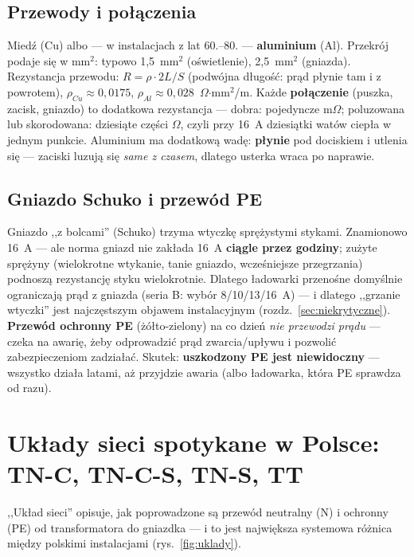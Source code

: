 \documentclass[11pt,a4paper]{article}
\newcommand{\ohm}{$\Omega$}
\begin{document}
\subsection{Przewody i połączenia}
Miedź (Cu) albo --- w instalacjach z lat 60.--80. --- \textbf{aluminium} (Al). Przekrój podaje się
w mm$^2$: typowo 1,5~mm$^2$ (oświetlenie), 2,5~mm$^2$ (gniazda). Rezystancja przewodu:
$R=\rho\cdot 2L/S$ (podwójna długość: prąd płynie tam i z powrotem), $\rho_{Cu}\approx0{,}0175$,
$\rho_{Al}\approx0{,}028$~\ohm$\cdot$mm$^2$/m. Każde \textbf{połączenie} (puszka, zacisk, gniazdo)
to dodatkowa rezystancja --- dobra: pojedyncze m\ohm; poluzowana lub skorodowana: dziesiąte części
\ohm{}, czyli przy 16~A dziesiątki watów ciepła w jednym punkcie. Aluminium ma dodatkową wadę:
\textbf{płynie} pod dociskiem i utlenia się --- zaciski luzują się \emph{same z czasem}, dlatego
usterka wraca po naprawie.

\subsection{Gniazdo Schuko i przewód PE}
Gniazdo ,,z bolcami'' (Schuko) trzyma wtyczkę sprężystymi stykami. Znamionowo 16~A --- ale norma
gniazd nie zakłada 16~A \textbf{ciągle przez godziny}; zużyte sprężyny (wielokrotne wtykanie,
tanie gniazdo, wcześniejsze przegrzania) podnoszą rezystancję styku wielokrotnie. Dlatego ładowarki
przenośne domyślnie ograniczają prąd z gniazda (seria B: wybór 8/10/13/16~A) --- i dlatego ,,grzanie
wtyczki'' jest najczęstszym objawem instalacyjnym (rozdz.~\ref{sec:niekrytyczne}).
\textbf{Przewód ochronny PE} (żółto-zielony) na co dzień \emph{nie przewodzi prądu} --- czeka na
awarię, żeby odprowadzić prąd zwarcia/upływu i pozwolić zabezpieczeniom zadziałać. Skutek:
\textbf{uszkodzony PE jest niewidoczny} --- wszystko działa latami, aż przyjdzie awaria (albo
ładowarka, która PE sprawdza od razu).

\section{Układy sieci spotykane w Polsce: TN-C, TN-C-S, TN-S, TT}
\label{sec:uklady}
,,Układ sieci'' opisuje, jak poprowadzone są przewód neutralny (N) i ochronny (PE) od transformatora
do gniazdka --- i to jest największa systemowa różnica między polskimi instalacjami
(rys.~\ref{fig:uklady}).
\end{document}
